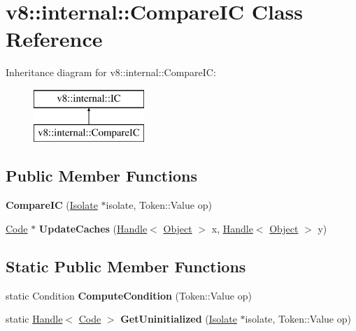 \hypertarget{classv8_1_1internal_1_1_compare_i_c}{}\section{v8\+:\+:internal\+:\+:Compare\+IC Class Reference}
\label{classv8_1_1internal_1_1_compare_i_c}
Inheritance diagram for v8\+:\+:internal\+:\+:Compare\+IC\+:\begin{figure}[H]
\begin{center}
\leavevmode
\includegraphics[height=2.000000cm]{classv8_1_1internal_1_1_compare_i_c}
\end{center}
\end{figure}
\subsection*{Public Member Functions}
\begin{DoxyCompactItemize}
\item 
{\bfseries Compare\+IC} (\hyperlink{classv8_1_1internal_1_1_isolate}{Isolate} $\ast$isolate, Token\+::\+Value op)\hypertarget{classv8_1_1internal_1_1_compare_i_c_a5e8d9e7f8a97a3bac684944775f51316}{}\label{classv8_1_1internal_1_1_compare_i_c_a5e8d9e7f8a97a3bac684944775f51316}

\item 
\hyperlink{classv8_1_1internal_1_1_code}{Code} $\ast$ {\bfseries Update\+Caches} (\hyperlink{classv8_1_1internal_1_1_handle}{Handle}$<$ \hyperlink{classv8_1_1internal_1_1_object}{Object} $>$ x, \hyperlink{classv8_1_1internal_1_1_handle}{Handle}$<$ \hyperlink{classv8_1_1internal_1_1_object}{Object} $>$ y)\hypertarget{classv8_1_1internal_1_1_compare_i_c_a74a0a050b279c5d7d2d862fa28d7d594}{}\label{classv8_1_1internal_1_1_compare_i_c_a74a0a050b279c5d7d2d862fa28d7d594}

\end{DoxyCompactItemize}
\subsection*{Static Public Member Functions}
\begin{DoxyCompactItemize}
\item 
static Condition {\bfseries Compute\+Condition} (Token\+::\+Value op)\hypertarget{classv8_1_1internal_1_1_compare_i_c_a67d9907f5802e582d5cf5487d7adca59}{}\label{classv8_1_1internal_1_1_compare_i_c_a67d9907f5802e582d5cf5487d7adca59}

\item 
static \hyperlink{classv8_1_1internal_1_1_handle}{Handle}$<$ \hyperlink{classv8_1_1internal_1_1_code}{Code} $>$ {\bfseries Get\+Uninitialized} (\hyperlink{classv8_1_1internal_1_1_isolate}{Isolate} $\ast$isolate, Token\+::\+Value op)\hypertarget{classv8_1_1internal_1_1_compare_i_c_a8002e3bdb5de3f4dbbf9a20c1a9b94c3}{}\label{classv8_1_1internal_1_1_compare_i_c_a8002e3bdb5de3f4dbbf9a20c1a9b94c3}

\end{DoxyCompactItemize}
